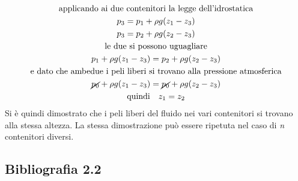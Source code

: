 	\begin{equation*}
		\begin{gathered}
			\text{applicando ai due contenitori la legge dell'idrostatica}\\
			p_3 = p_1 + \rho g (z_1 - z_3)\\
			p_3 = p_2 + \rho g (z_2 - z_3)\\
			\text{le due si possono uguagliare}\\
			p_1 + \rho g (z_1 - z_3) =   p_2 + \rho g (z_2 - z_3)\\
			\text{e dato che ambedue i peli liberi si trovano alla pressione atmosferica}\\
			\cancel{p_0} + \rho g (z_1 - z_3) =  \cancel{p_0} + \rho g (z_2 - z_3)\\
			\text{quindi} \quad z_1 = z_2
		\end{gathered} 
	\end{equation*}
Si è quindi dimostrato che i peli liberi del fluido nei vari contenitori si trovano alla stessa altezza. La stessa dimostrazione può essere ripetuta nel caso di \textit{n} contenitori diversi.
%
\subsection*{Bibliografia 2.2}
\cite[Cap.\ 3.1]{CengelCimbala}\\
\cite[Cap.\ 3.1]{PnueliGutfinger}